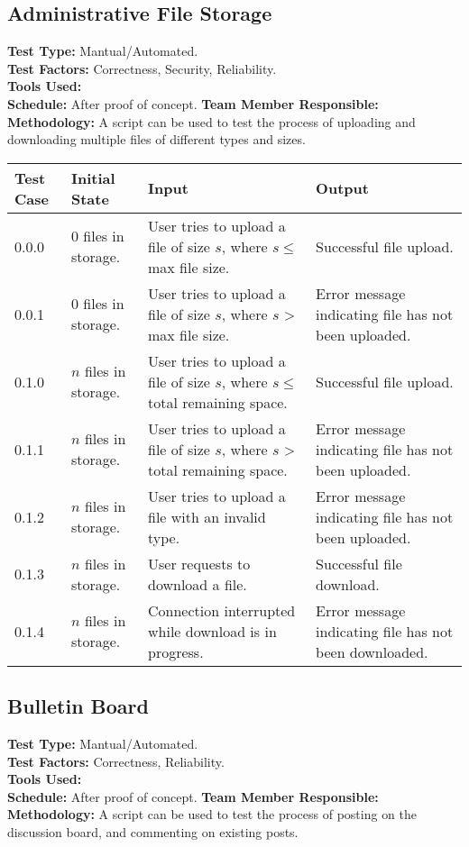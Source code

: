\documentclass[12pt]{article}
\begin{document}
\subsection{Administrative File Storage}
\textbf{Test Type:} Mantual/Automated. \\
\textbf{Test Factors:} Correctness, Security, Reliability. \\
\textbf{Tools Used:} \\
\textbf{Schedule:} After proof of concept.
\textbf{Team Member Responsible:} \\
\textbf{Methodology:} A script can be used to test the process of uploading and downloading multiple files of different types and sizes.

\begin{longtable}{|p{2cm}|p{3cm}|p{5cm}|p{5cm}|}
  \hline
  \textbf{Test Case} & \textbf{Initial State} & \textbf{Input} & \textbf{Output} \\ \hline
  0.0.0 & 0 files in storage. & User tries to upload a file of size $s$, where $s \le$ max file size. & Successful file upload.\\
  \hline
  0.0.1 & 0 files in storage. & User tries to upload a file of size $s$, where $s$ > max file size. & Error message indicating file has not been uploaded.\\
  \hline
  0.1.0 & $n$ files in storage. & User tries to upload a file of size $s$, where $s \le$ total remaining space. & Successful file upload.\\
  \hline
  0.1.1 & $n$ files in storage. & User tries to upload a file of size $s$, where $s$ > total remaining space. & Error message indicating file has not been uploaded.\\
  \hline
  0.1.2 & $n$ files in storage. & User tries to upload a file with an invalid type. & Error message indicating file has not been uploaded.\\
  \hline
  0.1.3 & $n$ files in storage. & User requests to download a file. & Successful file download.\\
  \hline
  0.1.4 & $n$ files in storage. & Connection interrupted while download is in progress. & Error message indicating file has not been downloaded.\\
  \hline
\end{longtable}

\subsection{Bulletin Board}
\textbf{Test Type:} Mantual/Automated. \\
\textbf{Test Factors:} Correctness, Reliability. \\
\textbf{Tools Used:} \\
\textbf{Schedule:} After proof of concept.
\textbf{Team Member Responsible:} \\
\textbf{Methodology:} A script can be used to test the process of posting on the discussion board, and commenting on existing posts.
\end{document}
